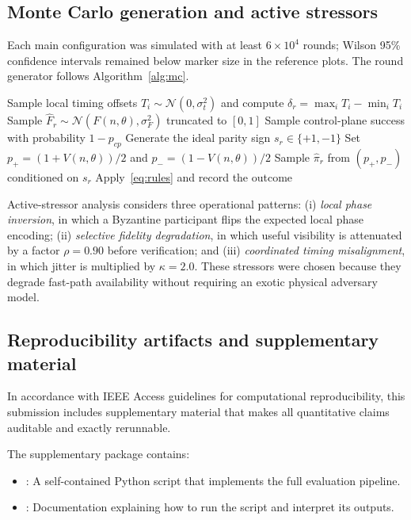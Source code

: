 \documentclass{ieeeaccess}
\begin{document}
\subsection{Monte Carlo generation and active stressors}
Each main configuration was simulated with at least $6\times 10^4$ rounds; Wilson 95\% confidence intervals remained below marker size in the reference plots. The round generator follows Algorithm~\ref{alg:mc}.

\begin{algorithm}[!t]
\caption{Monte Carlo simulator of one QMC round}
\label{alg:mc}
\footnotesize
\begin{algorithmic}[1]
\STATE Sample local timing offsets $T_i \sim \mathcal{N}(0,\sigma_t^2)$ and compute $\delta_r = \max_i T_i - \min_i T_i$
\STATE Sample $\widehat{F}_r \sim \mathcal{N}(F(n,\theta),\sigma_F^2)$ truncated to $[0,1]$
\STATE Sample control-plane success with probability $1-p_{cp}$
\STATE Generate the ideal parity sign $s_r \in \{+1,-1\}$
\STATE Set $p_{+}=(1+V(n,\theta))/2$ and $p_{-}=(1-V(n,\theta))/2$
\STATE Sample $\widehat{\pi}_r$ from $(p_{+},p_{-})$ conditioned on $s_r$
\STATE Apply~\eqref{eq:rules} and record the outcome
\end{algorithmic}
\end{algorithm}

Active-stressor analysis considers three operational patterns: (i) \textit{local phase inversion}, in which a Byzantine participant flips the expected local phase encoding; (ii) \textit{selective fidelity degradation}, in which useful visibility is attenuated by a factor $\rho = 0.90$ before verification; and (iii) \textit{coordinated timing misalignment}, in which jitter is multiplied by $\kappa = 2.0$. These stressors were chosen because they degrade fast-path availability without requiring an exotic physical adversary model.

\subsection{Reproducibility artifacts and supplementary material}
\label{sec:repro}
In accordance with IEEE Access guidelines for computational reproducibility, this submission includes supplementary material that makes all quantitative claims auditable and exactly rerunnable.

The supplementary package contains:
\begin{itemize}
    \item {}: A self-contained Python script that implements the full evaluation pipeline.
    \item {}: Documentation explaining how to run the script and interpret its outputs.
\end{itemize}
\end{document}
